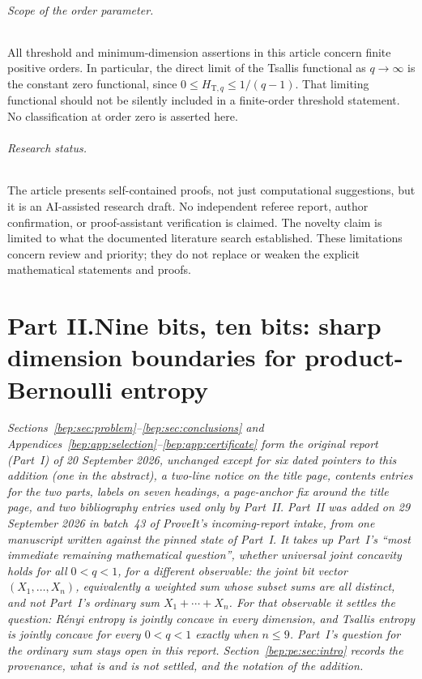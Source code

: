 \documentclass[11pt]{article}
\numberwithin{equation}{section}
\theoremstyle{definition}
\theoremstyle{remark}
\begin{document}
\paragraph{Scope of the order parameter.}
All threshold and minimum-dimension assertions in this article concern
finite positive orders. In particular, the direct limit of the Tsallis
functional as $q\to\infty$ is the constant zero functional, since
$0\leq H_{\mathrm T,q}\leq1/(q-1)$. That limiting functional should not be
silently included in a finite-order threshold statement. No classification
at order zero is asserted here.

\paragraph{Research status.}
The article presents self-contained proofs, not just computational
suggestions, but it is an AI-assisted research draft. No independent referee
report, author confirmation, or proof-assistant verification is claimed.
The novelty claim is limited to what the documented literature search
established. These limitations concern review and priority; they do not
replace or weaken the explicit mathematical statements and proofs.

\clearpage
{}
\part*{Part II.\quad Nine bits, ten bits: sharp dimension boundaries for product-Bernoulli entropy}

\noindent\emph{Sections~\ref{bep:sec:problem}--\ref{bep:sec:conclusions}
and Appendices~\ref{bep:app:selection}--\ref{bep:app:certificate} form the
original report (Part~I) of 20 September 2026, unchanged except for six
dated pointers to this addition (one in the abstract), a two-line notice
on the title page, contents entries for the two parts, labels on seven
headings, a page-anchor fix around the title page, and two bibliography
entries used only by Part~II.
Part~II was added on 29 September 2026 in batch~43 of ProveIt's
incoming-report intake, from one manuscript written against the pinned
state of Part~I. It takes up Part~I's ``most immediate remaining
mathematical question'', whether universal joint concavity holds for all
$0<q<1$, for a different observable: the \emph{joint bit vector}
$(X_1,\ldots,X_n)$, equivalently a weighted sum whose subset sums are all
distinct, and not Part~I's ordinary sum $X_1+\cdots+X_n$. For that
observable it settles the question: R\'enyi entropy is jointly concave in
every dimension, and Tsallis entropy is jointly concave for every $0<q<1$
exactly when $n\leq9$. Part~I's question for the ordinary sum stays open
in this report. Section~\ref{bep:pe:sec:intro} records the provenance,
what is and is not settled, and the notation of the addition.}
\end{document}
